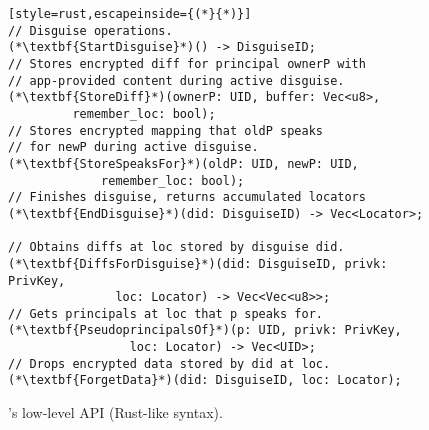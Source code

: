 \begin{figure}[t]
\begin{lstlisting}[style=rust,escapeinside={(*}{*)}]
// Disguise operations.
(*\textbf{StartDisguise}*)() -> DisguiseID;
// Stores encrypted diff for principal ownerP with
// app-provided content during active disguise.
(*\textbf{StoreDiff}*)(ownerP: UID, buffer: Vec<u8>,
         remember_loc: bool);
// Stores encrypted mapping that oldP speaks
// for newP during active disguise.
(*\textbf{StoreSpeaksFor}*)(oldP: UID, newP: UID,
             remember_loc: bool);
// Finishes disguise, returns accumulated locators
(*\textbf{EndDisguise}*)(did: DisguiseID) -> Vec<Locator>;

// Obtains diffs at loc stored by disguise did.
(*\textbf{DiffsForDisguise}*)(did: DisguiseID, privk: PrivKey,
               loc: Locator) -> Vec<Vec<u8>>;
// Gets principals at loc that p speaks for.
(*\textbf{PseudoprincipalsOf}*)(p: UID, privk: PrivKey,
                 loc: Locator) -> Vec<UID>;
// Drops encrypted data stored by did at loc.
(*\textbf{ForgetData}*)(did: DisguiseID, loc: Locator);
\end{lstlisting}
\caption{\sys's low-level API (Rust-like syntax).}
\label{f:api-low}
\end{figure}


